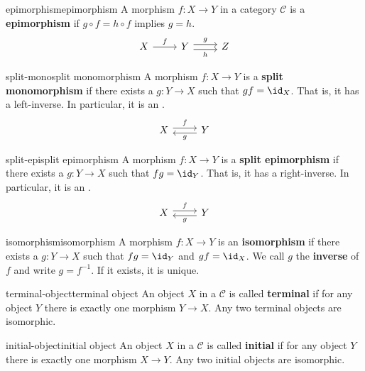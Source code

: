 \begin{topic}{epimorphism}{epimorphism}
    A morphism $f : X \to Y$ in a category $\mathcal{C}$ is a \textbf{epimorphism} if $g \circ f = h \circ f$ implies $g = h$.
    \[ \begin{tikzcd} X \arrow{r}{f} & Y \arrow[shift left=0.25em]{r}{g} \arrow[shift right=0.25em, swap]{r}{h} & Z \end{tikzcd} \]
\end{topic}

\begin{topic}{split-mono}{split monomorphism}
    A morphism $f : X \to Y$ is a \textbf{split monomorphism} if there exists a $g : Y \to X$ such that $gf = \id_X$. That is, it has a left-inverse. In particular, it is an .
    \[ \begin{tikzcd} X \arrow[shift left=0.25em]{r}{f} & Y \arrow[shift left=0.25em]{l}{g} \end{tikzcd} \]
\end{topic}

\begin{topic}{split-epi}{split epimorphism}
    A morphism $f : X \to Y$ is a \textbf{split epimorphism} if there exists a $g : Y \to X$ such that $fg = \id_Y$. That is, it has a right-inverse. In particular, it is an .
    \[ \begin{tikzcd} X \arrow[shift left=0.25em]{r}{f} & Y \arrow[shift left=0.25em]{l}{g} \end{tikzcd} \]
\end{topic}

\begin{topic}{isomorphism}{isomorphism}
    A morphism $f : X \to Y$ is an \textbf{isomorphism} if there exists a $g : Y \to X$ such that $fg = \id_Y$ and $gf = \id_X$. We call $g$ the \textbf{inverse} of $f$ and write $g = f^{-1}$. If it exists, it is unique.
\end{topic}

\begin{topic}{terminal-object}{terminal object}
    An object $X$ in a  $\mathcal{C}$ is called \textbf{terminal} if for any object $Y$ there is exactly one morphism $Y \to X$. Any two terminal objects are isomorphic.
\end{topic}

\begin{topic}{initial-object}{initial object}
    An object $X$ in a  $\mathcal{C}$ is called \textbf{initial} if for any object $Y$ there is exactly one morphism $X \to Y$. Any two initial objects are isomorphic.
\end{topic}

